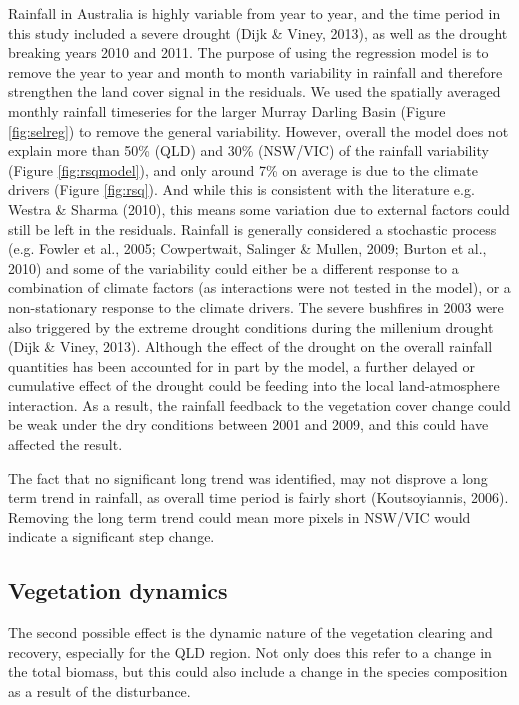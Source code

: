 \documentclass[fleqn,10pt,lineno]{wlpeerj} %
\theoremstyle{definition}
\theoremstyle{definition}
\theoremstyle{definition}
\theoremstyle{remark}
\begin{document}
Rainfall in Australia is highly variable from year to year, and the time
period in this study included a severe drought (Dijk \& Viney, 2013), as
well as the drought breaking years 2010 and 2011. The purpose of using
the regression model is to remove the year to year and month to month
variability in rainfall and therefore strengthen the land cover signal
in the residuals. We used the spatially averaged monthly rainfall
timeseries for the larger Murray Darling Basin (Figure \ref{fig:selreg})
to remove the general variability. However, overall the model does not
explain more than 50\% (QLD) and 30\% (NSW/VIC) of the rainfall
variability (Figure \ref{fig:rsqmodel}), and only around 7\% on average
is due to the climate drivers (Figure \ref{fig:rsq}). And while this is
consistent with the literature e.g. Westra \& Sharma (2010), this means
some variation due to external factors could still be left in the
residuals. Rainfall is generally considered a stochastic process (e.g.
Fowler et al., 2005; Cowpertwait, Salinger \& Mullen, 2009; Burton et
al., 2010) and some of the variability could either be a different
response to a combination of climate factors (as interactions were not
tested in the model), or a non-stationary response to the climate
drivers. The severe bushfires in 2003 were also triggered by the extreme
drought conditions during the millenium drought (Dijk \& Viney, 2013).
Although the effect of the drought on the overall rainfall quantities
has been accounted for in part by the model, a further delayed or
cumulative effect of the drought could be feeding into the local
land-atmosphere interaction. As a result, the rainfall feedback to the
vegetation cover change could be weak under the dry conditions between
2001 and 2009, and this could have affected the result.

The fact that no significant long trend was identified, may not disprove
a long term trend in rainfall, as overall time period is fairly short
(Koutsoyiannis, 2006). Removing the long term trend could mean more
pixels in NSW/VIC would indicate a significant step change.

\subsection{Vegetation dynamics}\label{vegetation-dynamics}

The second possible effect is the dynamic nature of the vegetation
clearing and recovery, especially for the QLD region. Not only does this
refer to a change in the total biomass, but this could also include a
change in the species composition as a result of the disturbance.
\end{document}
